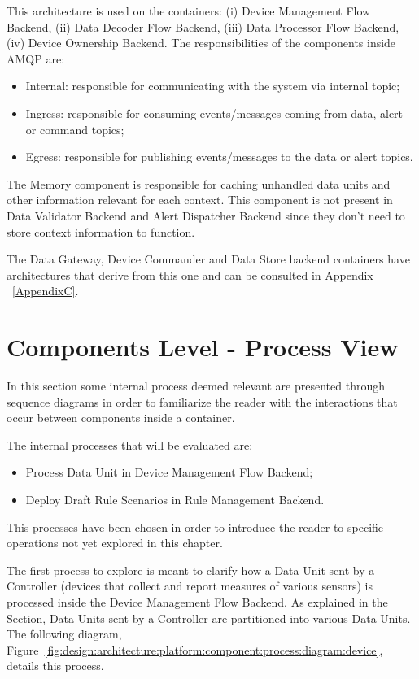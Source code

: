 This architecture is used on the containers: (i) Device Management Flow Backend, (ii) Data Decoder Flow Backend, (iii) Data Processor Flow Backend, (iv) Device Ownership Backend. The responsibilities of the components inside AMQP are:

\begin{itemize}
   \item Internal: responsible for communicating with the system via internal topic;
   \item Ingress: responsible for consuming events/messages coming from data, alert or command topics;
   \item Egress: responsible for publishing events/messages to the data or alert topics.
\end{itemize}

The Memory component is responsible for caching unhandled data units and other information relevant for each context. This component is not present in Data Validator Backend and Alert Dispatcher Backend since they don't need to store context information to function.

The Data Gateway, Device Commander and Data Store backend containers have architectures that derive from this one and can be consulted in Appendix ~\ref{AppendixC}.

\section{Components Level - Process View}
\label{par:design:architecture:platform:components:process}

In this section some internal process deemed relevant are presented through sequence diagrams in order to familiarize the reader with the interactions that occur between components inside a container.

The internal processes that will be evaluated are:

\begin{itemize}
   \item Process Data Unit in Device Management Flow Backend;
   \item Deploy Draft Rule Scenarios in Rule Management Backend.
\end{itemize}

This processes have been chosen in order to introduce the reader to specific operations not yet explored in this chapter.

The first process to explore is meant to clarify how a Data Unit sent by a Controller (devices that collect and report measures of various sensors) is processed inside the Device Management Flow Backend. As explained in the  Section, Data Units sent by a Controller are partitioned into various Data Units. The following diagram, Figure~\ref{fig:design:architecture:platform:component:process:diagram:device}, details this process.


